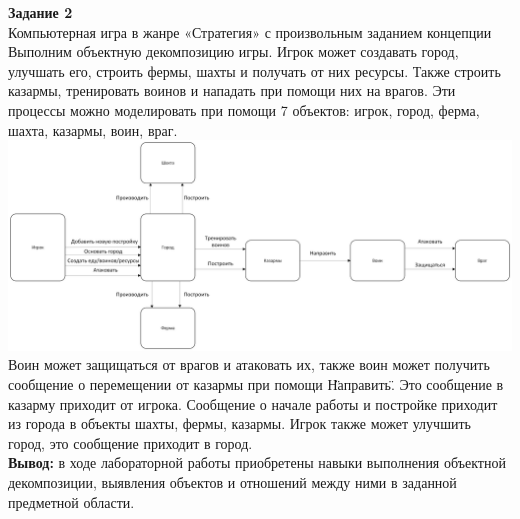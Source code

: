 \documentclass[a4paper,14pt]{extarticle}
\begin{document}
\textbf{Задание 2}\\
Компьютерная игра в жанре «Стратегия» с произвольным заданием концепции\\
Выполним объектную декомпозицию игры. 
Игрок может создавать город, улучшать его, строить фермы, шахты и получать от них ресурсы. 
Также строить казармы, тренировать воинов и нападать при помощи них на врагов.
Эти процессы можно моделировать при помощи 7 объектов: 
игрок, город, ферма, шахта, казармы, воин, враг.\\
\includegraphics[width=190mm]{task2}\\
Воин может защищаться от врагов и атаковать их, также воин
может получить сообщение о перемещении от казармы при помощи \"Направить\".
Это сообщение в казарму приходит от игрока. Сообщение о начале работы и постройке 
приходит из города в объекты шахты, фермы, казармы. Игрок также может 
улучшить город, это сообщение приходит в город. \\

\textbf{Вывод: } в ходе лабораторной работы приобретены навыки выполнения объектной
декомпозиции, выявления объектов и отношений между ними в заданной
предметной области.
\end{document}
